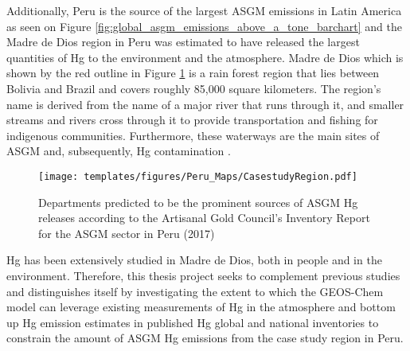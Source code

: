 \begin{flushleft}
Additionally, Peru is the source of the largest ASGM emissions in Latin America as seen on Figure \ref{fig:global_asgm_emissions_above_a_tone_barchart} and the Madre de Dios region in Peru was estimated to have released the largest quantities of Hg to the environment and the atmosphere\cite{agc_reporte_2017}. Madre de Dios which is shown by the red outline in Figure \ref{fig:PeruCS} is a rain forest region that lies between Bolivia and Brazil and covers roughly 85,000 square kilometers. The region's name is derived from the name of a major river that runs through it, and smaller streams and rivers cross through it to provide transportation and fishing for indigenous communities. Furthermore, these waterways are the main sites of ASGM and, subsequently, Hg contamination \cite{ashe_elevated_2012,agc_reporte_2017}. 
\begin{figure}[H]
  \texttt{[image: templates/figures/Peru\_Maps/CasestudyRegion.pdf]}
  \centering
  \caption{Departments predicted to be the prominent sources of ASGM Hg releases according to the Artisanal Gold Council's  Inventory Report for the ASGM sector in Peru (2017) }
  \label{fig:PeruCS}
\end{figure}
\FloatBarrier

Hg has been extensively studied in Madre de Dios, both in people and in the environment. Therefore, this thesis project seeks to complement previous studies and distinguishes itself  by investigating the extent to which the GEOS-Chem model can leverage existing measurements of Hg in the atmosphere and bottom up Hg emission estimates in published Hg global and national inventories to constrain the amount of ASGM Hg emissions from the case study region in Peru. 

\end{flushleft}
